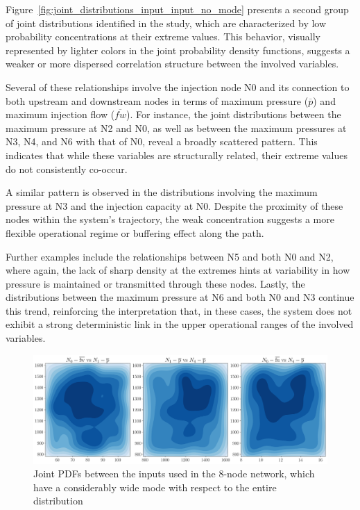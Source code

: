 Figure~\cref{fig:joint_distributions_input_input_no_mode} presents a second group of joint distributions identified in the study, which are characterized by low probability concentrations at their extreme values. This behavior, visually represented by lighter colors in the joint probability density functions, suggests a weaker or more dispersed correlation structure between the involved variables.

Several of these relationships involve the injection node N0 and its connection to both upstream and downstream nodes in terms of maximum pressure ($\overline{p}$) and maximum injection flow ($\overline{fw}$). For instance, the joint distributions between the maximum pressure at N2 and N0, as well as between the maximum pressures at N3, N4, and N6 with that of N0, reveal a broadly scattered pattern. This indicates that while these variables are structurally related, their extreme values do not consistently co-occur.

A similar pattern is observed in the distributions involving the maximum pressure at N3 and the injection capacity at N0. Despite the proximity of these nodes within the system’s trajectory, the weak concentration suggests a more flexible operational regime or buffering effect along the path.

Further examples include the relationships between N5 and both N0 and N2, where again, the lack of sharp density at the extremes hints at variability in how pressure is maintained or transmitted through these nodes. Lastly, the distributions between the maximum pressure at N6 and both N0 and N3 continue this trend, reinforcing the interpretation that, in these cases, the system does not exhibit a strong deterministic link in the upper operational ranges of the involved variables.\begin{figure}


    \begin{center}
        \includegraphics[width=.75\textwidth]{figures/Chapter_NonLinealCensnet/PDF_inputs_inputs_wide_mode.png}
    \end{center}
    \caption{Joint PDFs between the inputs used in the 8-node network, which have a considerably wide mode with respect to the entire distribution }
    \label{fig:joint_distributions_input_input_wide_mode}
\end{figure}
 

